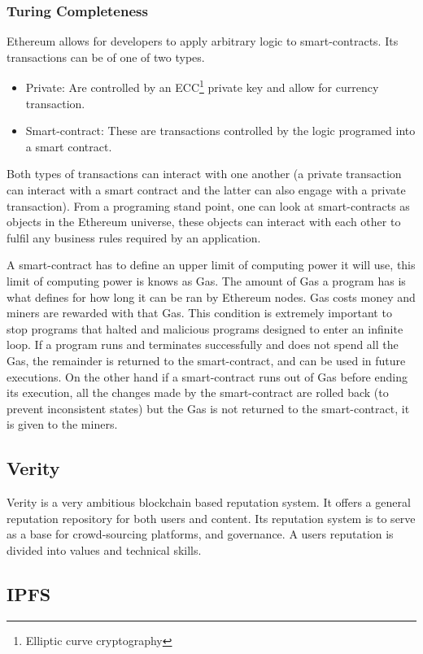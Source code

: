 \documentclass[llncsdoc]{llncs}
\begin{document}
\subsubsection{Turing Completeness}
Ethereum allows for developers to apply arbitrary logic to smart-contracts. Its transactions can be of one of two types.
\begin{itemize}
    \item Private: Are controlled by an ECC\footnote{Elliptic curve cryptography} private key and allow for currency transaction.
    \item Smart-contract: These are transactions controlled by the logic programed into a smart contract.
\end{itemize}
Both types of transactions can interact with one another (a private transaction can interact with a smart contract and the latter can also engage with a private transaction).
From a programing stand point, one can look at smart-contracts as objects in the Ethereum universe, these objects can interact with each other to fulfil any business rules required by an application.

A smart-contract has to define an upper limit of computing power it will use, this limit of computing power is knows as Gas. The amount of Gas a program has is what defines for how long it can be ran by Ethereum nodes. Gas costs money and miners are rewarded with that Gas. This condition is extremely important to stop programs that halted and malicious programs designed to enter an infinite loop. If a program runs and terminates successfully and does not spend all the Gas, the remainder is returned to the smart-contract, and can be used in future executions. On the other hand if a smart-contract runs out of Gas before ending its execution, all the changes made by the smart-contract are rolled back (to prevent inconsistent states) but the Gas is not returned to the smart-contract, it is given to the miners.

\subsection{Verity}

Verity is a very ambitious blockchain based reputation system. It offers a general reputation repository for both users and content. Its reputation system is to serve as a base for crowd-sourcing platforms, and governance. A users reputation is divided into values and technical skills. 

\subsection{IPFS}
\end{document}
